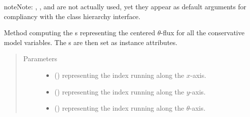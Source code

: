 \documentclass[letterpaper,10pt,english]{sphinxmanual}
\begin{document}
\begin{fulllineitems}
\begin{fulllineitems}
\begin{quote}
\begin{description}
\begin{itemize}
\end{itemize}

\end{description}\end{quote}

\begin{sphinxadmonition}{note}{Note:}
, , and  are not actually used, yet they appear
as default arguments for compliancy with the class hierarchy interface.
\end{sphinxadmonition}

\end{fulllineitems}


\begin{fulllineitems}
\label{\detokenize{api:tasmania.dycore.flux_isentropic_centered.FluxIsentropicCentered._compute_vertical_fluxes}}
Method computing the s representing the centered \(\theta\)-flux
for all the conservative model variables.
The s are then set as instance attributes.
\begin{quote}\begin{description}
\item[{Parameters}] \leavevmode\begin{itemize}
\item {} 
 () \textendash{}  representing the index running along the \(x\)-axis.

\item {} 
 () \textendash{}  representing the index running along the \(y\)-axis.

\item {} 
 () \textendash{}  representing the index running along the \(\theta\)-axis.


\end{itemize}
\end{description}
\end{quote}
\end{fulllineitems}
\end{fulllineitems}
\end{document}
